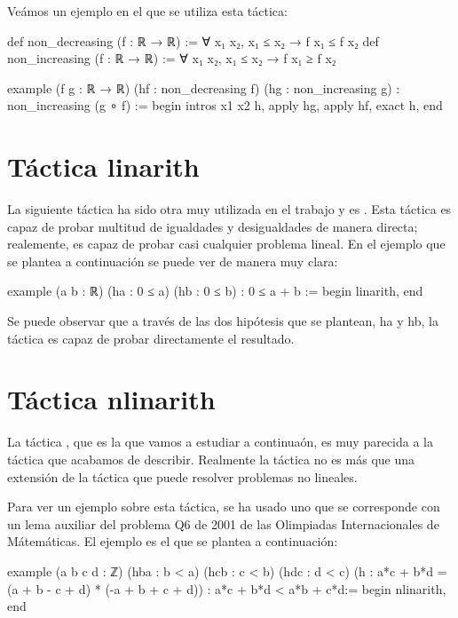 Veámos un ejemplo en el que se utiliza esta táctica:
\begin{leancode}
def non_decreasing (f : ℝ → ℝ) := ∀ x₁ x₂, x₁ ≤ x₂ → f x₁ ≤ f x₂
def non_increasing (f : ℝ → ℝ) := ∀ x₁ x₂, x₁ ≤ x₂ → f x₁ ≥ f x₂

example (f g : ℝ → ℝ) (hf : non_decreasing f) (hg : non_increasing g) :
non_increasing (g ∘ f) :=
begin
  intros x1 x2 h,
  apply hg,
  apply hf,
  exact h,
end
\end{leancode}

\section{Táctica linarith}

La siguiente táctica ha sido otra muy utilizada en el trabajo y es
. Esta táctica es capaz de probar multitud de
igualdades y desigualdades de manera directa; realemente, es capaz de probar
casi cualquier problema lineal. En el ejemplo que se plantea a continuación
se puede ver de manera muy clara:

\begin{leancode}
example (a b : ℝ) (ha : 0 ≤ a) (hb : 0 ≤ b) : 0 ≤ a + b :=
begin
  linarith,
end
\end{leancode}

Se puede observar que a través de las dos hipótesis que se plantean, ha y hb,
la táctica  es capaz de probar directamente el
resultado.

\section{Táctica nlinarith}

La táctica , que es la que vamos a estudiar a
continuaón, es muy parecida a la táctica  que
acabamos de describir. Realmente la táctica  no
es más que una extensión de la táctica  que puede
resolver problemas no lineales.

Para ver un ejemplo sobre esta táctica, se ha usado uno que se corresponde con
un lema auxiliar del problema Q6 de 2001 de las Olimpiadas Internacionales de
Mátemáticas. El ejemplo es el que se plantea a continuación:

\begin{leancode}
example (a b c d : ℤ)
  (hba : b < a)
  (hcb : c < b)
  (hdc : d < c)
  (h : a*c + b*d = (a + b - c + d) * (-a + b + c + d))
  : a*c + b*d < a*b + c*d:=
begin
  nlinarith,
end
\end{leancode}

